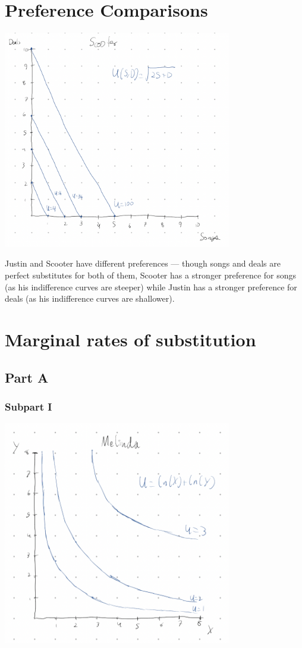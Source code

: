 \documentclass[8pt]{extarticle}
\begin{document}
{\section{Preference Comparisons}
\begin{center}
	\includegraphics[width=10cm]{HW3Q2}
\end{center}
Justin and Scooter have different preferences — though songs and deals are perfect substitutes for both of them, Scooter has a stronger preference for songs (as his indifference curves are steeper) while Justin has a stronger preference for deals (as his indifference curves are shallower).
\section{Marginal rates of substitution}
\subsection*{Part A}
\subsubsection*{Subpart I}
\begin{center}
	\includegraphics[width=10cm]{HW3Q3A}
\end{center}
}
\end{document}
